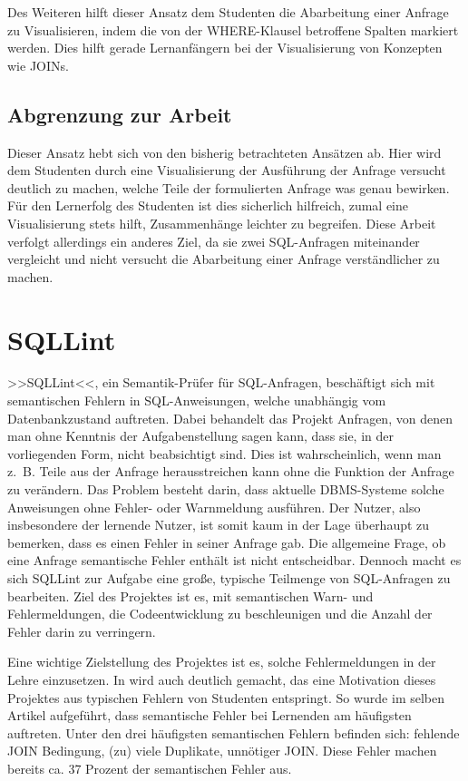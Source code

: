 Des Weiteren hilft dieser Ansatz dem Studenten die Abarbeitung einer Anfrage zu Visualisieren, indem die von der WHERE-Klausel betroffene Spalten markiert werden. Dies hilft gerade Lernanfängern bei der Visualisierung von Konzepten wie JOINs.

\subsection*{Abgrenzung zur Arbeit}

Dieser Ansatz hebt sich von den bisherig betrachteten Ansätzen ab. Hier wird dem Studenten durch eine Visualisierung der Ausführung der Anfrage versucht deutlich zu machen, welche Teile der formulierten Anfrage was genau bewirken. Für den Lernerfolg des Studenten ist dies sicherlich hilfreich, zumal eine Visualisierung stets hilft, Zusammenhänge leichter zu begreifen. Diese Arbeit verfolgt allerdings ein anderes Ziel, da sie zwei SQL-Anfragen miteinander vergleicht und nicht versucht die Abarbeitung einer Anfrage verständlicher zu machen.

\section{SQLLint}

>>SQLLint<<, ein Semantik-Prüfer für SQL-Anfragen, beschäftigt sich mit semantischen Fehlern in SQL-Anweisungen, welche unabhängig vom Datenbankzustand auftreten. Dabei behandelt das Projekt Anfragen, von denen man ohne Kenntnis der Aufgabenstellung sagen kann, dass sie, in der vorliegenden Form, nicht beabsichtigt sind. Dies ist wahrscheinlich, wenn man \mbox{z. B.} Teile aus der Anfrage herausstreichen kann ohne die Funktion der Anfrage zu verändern.  Das Problem besteht darin, dass aktuelle DBMS-Systeme solche Anweisungen ohne Fehler- oder Warnmeldung ausführen. Der Nutzer, also insbesondere der lernende Nutzer, ist somit kaum in der Lage überhaupt zu bemerken, dass es einen Fehler in seiner Anfrage gab. Die allgemeine Frage, ob eine Anfrage semantische Fehler enthält ist nicht entscheidbar. Dennoch macht es sich SQLLint zur Aufgabe eine große, typische Teilmenge von SQL-Anfragen zu bearbeiten. Ziel des Projektes ist es, mit semantischen Warn- und Fehlermeldungen, die Codeentwicklung zu beschleunigen und die Anzahl der Fehler darin zu verringern.

Eine wichtige Zielstellung des Projektes ist es, solche Fehlermeldungen in der Lehre einzusetzen. In \cite{sqllint1} wird auch deutlich gemacht, das eine Motivation dieses Projektes aus typischen Fehlern von Studenten entspringt. So wurde im selben Artikel aufgeführt, dass semantische Fehler bei Lernenden am häufigsten auftreten. Unter den drei häufigsten semantischen Fehlern befinden sich: fehlende JOIN Bedingung, (zu) viele Duplikate, unnötiger JOIN. Diese Fehler machen bereits ca. 37 Prozent der semantischen Fehler aus.

